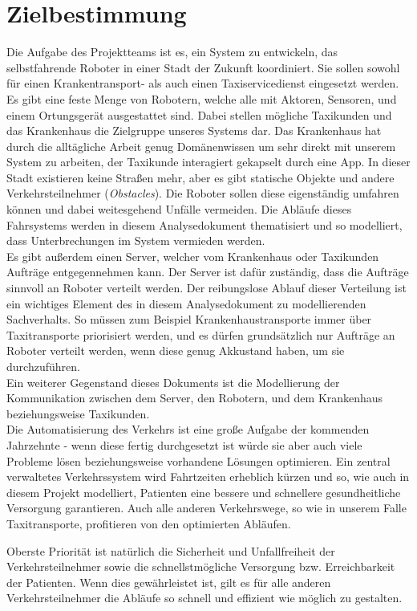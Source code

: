 
\section{Zielbestimmung}
Die Aufgabe des Projektteams ist es, ein System zu entwickeln, das selbstfahrende Roboter in einer Stadt der Zukunft koordiniert. 
Sie sollen sowohl für einen Krankentransport- als auch einen Taxiservicedienst eingesetzt werden. \\
Es gibt eine feste Menge von Robotern, welche alle mit Aktoren, Sensoren, und einem Ortungsgerät ausgestattet sind. Dabei stellen mögliche Taxikunden und das Krankenhaus die Zielgruppe unseres Systems dar. 
Das Krankenhaus hat durch die alltägliche Arbeit genug Domänenwissen um sehr direkt mit unserem System zu arbeiten, der Taxikunde interagiert gekapselt durch eine App.
In dieser Stadt existieren keine Straßen mehr, aber es gibt statische Objekte und andere Verkehrsteilnehmer (\textit{Obstacles}). 
Die Roboter sollen diese  eigenständig umfahren können und dabei weitesgehend Unfälle vermeiden. 
Die Abläufe dieses Fahrsystems werden in diesem Analysedokument thematisiert und so modelliert, dass Unterbrechungen im System vermieden werden.\\ 
Es gibt außerdem einen Server, welcher vom Krankenhaus oder Taxikunden Aufträge entgegennehmen kann. 
Der Server ist dafür zuständig, dass die Aufträge sinnvoll an Roboter verteilt werden. 
Der reibungslose Ablauf dieser Verteilung ist ein wichtiges Element des in diesem Analysedokument zu modellierenden Sachverhalts. 
So müssen zum Beispiel Krankenhaustransporte immer über Taxitransporte priorisiert werden, und es dürfen grundsätzlich nur Aufträge an Roboter verteilt werden, wenn diese genug Akkustand haben, um sie durchzuführen.\\
Ein weiterer Gegenstand dieses Dokuments ist die Modellierung der Kommunikation zwischen dem Server, den Robotern, und dem Krankenhaus beziehungsweise Taxikunden.\\

Die Automatisierung des Verkehrs ist eine große Aufgabe der kommenden Jahrzehnte - wenn diese fertig durchgesetzt ist würde sie aber auch viele Probleme lösen beziehungsweise vorhandene Lösungen optimieren. Ein zentral verwaltetes Verkehrssystem wird Fahrtzeiten erheblich kürzen und so, wie auch in diesem Projekt modelliert, Patienten eine bessere und schnellere gesundheitliche Versorgung garantieren. Auch alle anderen Verkehrswege, so wie in unserem Falle Taxitransporte, profitieren von den optimierten Abläufen.

Oberste Priorität ist natürlich die Sicherheit und Unfallfreiheit der Verkehrsteilnehmer sowie die schnellstmögliche Versorgung bzw. Erreichbarkeit der Patienten. Wenn dies gewährleistet ist, gilt es für alle anderen Verkehrsteilnehmer die Abläufe so schnell und effizient wie möglich zu gestalten.\\


\pagebreak
